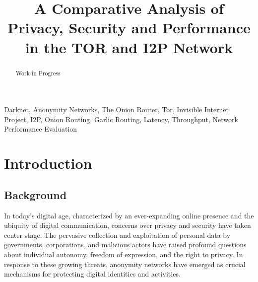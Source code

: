 \documentclass[12pt,conference]{IEEEtran}
\begin{document}
\title{A Comparative Analysis of Privacy, Security and Performance in the TOR and I2P Network}

\author{
\and
{}
\and
{}
}

\maketitle

\begin{abstract}
Work in Progress
\end{abstract}

\begin{IEEEkeywords}
Darknet, Anonymity Networks, The Onion Router, Tor, Invisible Internet Project, I2P, Onion Routing, Garlic Routing, Latency, Throughput, Network Performance Evaluation
\end{IEEEkeywords}

\section{Introduction}
\subsection{Background}
In today's digital age, characterized by an ever-expanding online presence and the ubiquity of digital communication, concerns over privacy and security have taken center stage. The pervasive collection and exploitation of personal data by governments, corporations, and malicious actors have raised profound questions about individual autonomy, freedom of expression, and the right to privacy. In response to these growing threats, anonymity networks have emerged as crucial mechanisms for protecting digital identities and activities\cite{aComparativeStudyOnAnonymizingNetworks}.
\end{document}
